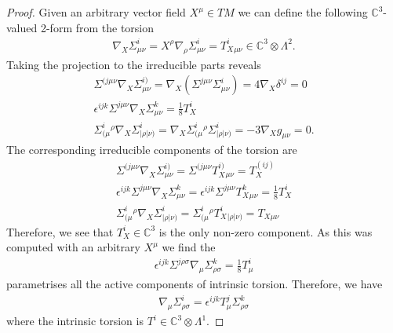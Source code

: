\documentclass[10pt]{report}
\theoremstyle{definition}
\newcommand{\C}[0]{\mathbb{C}}
\newcommand{\E}[0]{\C^3}
\begin{document}
\begin{proof}
    Given an arbitrary vector field $X^\mu \in TM$ we can define the following $\E$-valued 2-form from the torsion 
    \begin{align}
        \nabla_X \Sigma^i_{\mu\nu} = X^\rho \nabla_\rho \Sigma^i_{\mu\nu} = T_X^i{}_{\mu\nu} \in \E \otimes \Lambda^2.
    \end{align}
    Taking the projection to the irreducible parts reveals
    \begin{align}
        \Sigma^{(j\mu\nu} \nabla_X \Sigma^{i)}_{\mu\nu} = \nabla_X (\Sigma^{j\mu\nu} \Sigma^i_{\mu\nu}) = 4 \nabla_X \delta^{ij} = 0 \\
        \epsilon^{ijk} \Sigma^{j\mu\nu} \nabla_X \Sigma^k_{\mu\nu} = \frac{1}{8} T^i_X \\
        \Sigma^i_{(\mu}{}^\rho \nabla_X \Sigma^i_{|\rho|\nu)} = \nabla_X \Sigma^i_{(\mu}{}^\rho \Sigma^i_{|\rho|\nu)} = -3 \nabla_X g_{\mu\nu} = 0.
    \end{align}
    The corresponding irreducible components of the torsion are 
    \begin{align}
        \Sigma^{(j\mu\nu} \nabla_X \Sigma^{i)}_{\mu\nu} = \Sigma^{(j\mu\nu} T_X^{i)}{}_{\mu\nu} = T_X^{(ij)} \\
        \epsilon^{ijk} \Sigma^{j\mu\nu} \nabla_X \Sigma^k_{\mu\nu} = \epsilon^{ijk} \Sigma^{j\mu\nu} T_X^k{}_{\mu\nu} = \frac{1}{8} T_X^i \\
        \Sigma^i_{(\mu}{}^\rho \nabla_X \Sigma^i_{|\rho|\nu)} = \Sigma^i_{(\mu}{}^\rho T_X^i{}_{|\rho|\nu)} = T_{X \mu\nu}
    \end{align}
    Therefore, we see that $T^i_X \in \E$ is the only non-zero component. As this was computed with an arbitrary $X^\mu$ we find the 
    \begin{align}
        \epsilon^{ijk} \Sigma^{j\rho\sigma} \nabla_\mu \Sigma^k_{\rho\sigma} = \frac{1}{8} T^i_\mu
    \end{align}
    parametrises all the active components of intrinsic torsion. Therefore, we have 
    \begin{align}
        \nabla_\mu \Sigma^i_{\rho\sigma} = \epsilon^{ijk} T^j_\mu \Sigma^k_{\rho\sigma}
    \end{align}
    where the intrinsic torsion is $T^i \in \E \otimes \Lambda^1$.
\end{proof}
\end{document}
